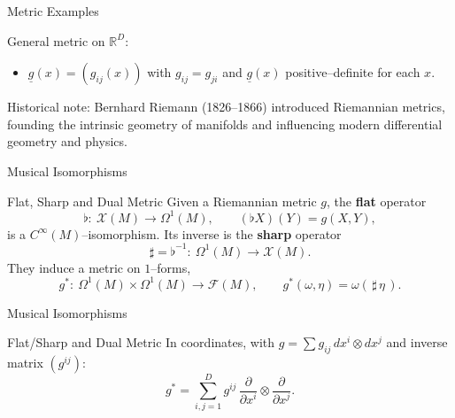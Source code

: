 \begin{frame}{Metric Examples}
\begin{block}{General metric on $\mathbb{R}^D$:}
\begin{itemize}
\item $\underline{g}(x)=(g_{ij}(x))$ with $g_{ij}=g_{ji}$ and
$\underline{g}(x)$ positive–definite for each $x$.
\end{itemize}
\end{block}

\vspace{0.15cm}
\begin{block}{Historical note:}
Bernhard Riemann (1826–1866) introduced Riemannian metrics, founding the intrinsic geometry of manifolds and influencing modern differential geometry and physics.
\end{block}
\end{frame}


\begin{frame}{Musical Isomorphisms}
\begin{block}{Flat, Sharp and Dual Metric}
Given a Riemannian metric $g$, the \textbf{flat} operator
\[
\flat:\ \mathcal{X}(M)\to\Omega^1(M),\qquad (\flat X)(Y)=g(X,Y),
\]
is a $C^\infty(M)$–isomorphism. Its inverse is the \textbf{sharp} operator
\[
\sharp=\flat^{-1}:\ \Omega^1(M)\to\mathcal{X}(M).
\]
They induce a metric on $1$–forms,
\[
g^*:\ \Omega^1(M)\times \Omega^1(M)\to\mathcal{F}(M),\qquad
g^*(\omega,\eta)=\omega(\,\sharp\,\eta\,).
\]
\end{block}
\end{frame}

\begin{frame}{Musical Isomorphisms}
\begin{block}{Flat/Sharp and Dual Metric}
In coordinates, with $g=\sum g_{ij}\,dx^i\otimes dx^j$ and inverse matrix $(g^{ij})$:
\[
g^*=\sum_{i,j=1}^D g^{ij}\,\frac{\partial}{\partial x^i}\otimes \frac{\partial}{\partial x^j}.
\]
\end{block}

\begin{center}
\end{center}
\end{frame}


